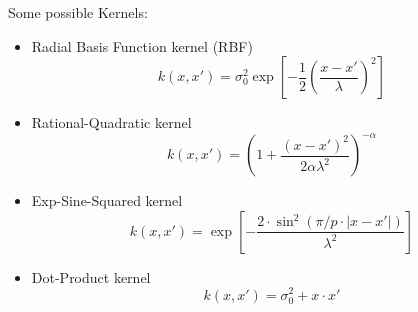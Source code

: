 Some possible Kernels:
\begin{itemize}
    \item Radial Basis Function kernel (RBF)
    \[
    k(x,x') = \sigma_0^2\exp\left[-\frac{1}{2}(\frac{x-x'}{\lambda})^2\right]
    \]
    \item Rational-Quadratic kernel
    \[
    k(x,x') = \left(1 + \frac{(x-x')^2}{2\alpha\lambda^2}\right)^{-\alpha}
    \]
    \item Exp-Sine-Squared kernel
    \[
    k(x,x') = \exp\left[-\frac{2 \cdot \sin^2(\pi/p \cdot |x-x'|)}{\lambda^2}\right]
    \]
    \item Dot-Product kernel
    \[
    k(x,x') = \sigma^2_0 + x\cdot x'
    \]
\end{itemize}
